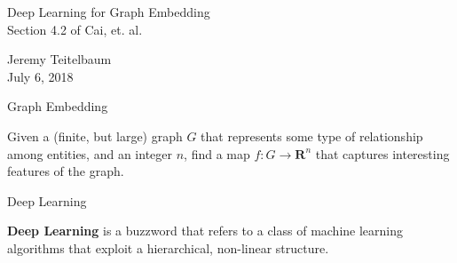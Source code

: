 \documentclass{beamer}
\begin{document}
\begin{frame}
  \begin{center}
    Deep Learning for Graph Embedding \\
    Section 4.2 of Cai, et. al. \\
  \end{center}

  \vskip 1.5in
  Jeremy Teitelbaum \\
  July 6, 2018
\end{frame}

\begin{frame}{Graph Embedding}
  \begin{problem} Given a (finite, but large) graph $G$ that represents some type of relationship among
    entities, and an integer $n$,  find a map $f:G\to \mathbf{R}^{n}$ that captures interesting features of the graph.
  \end{problem}

  
\end{frame}
\begin{frame}{Deep Learning}
  \begin{definition} \textbf{Deep Learning} is a  buzzword that refers to a class of machine learning algorithms
    that exploit a hierarchical, non-linear structure.
  \end{definition}
\end{frame}
\end{document}
